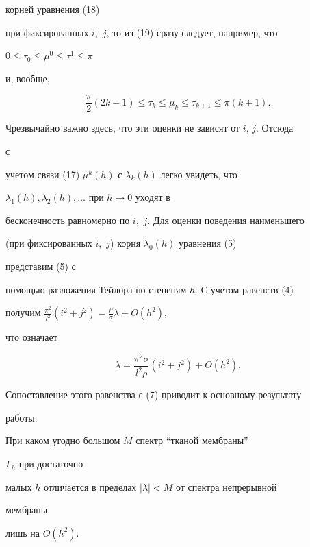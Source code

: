 корней уравнения (18) 


при фиксированных $i$,~$j$, то из (19) сразу следует, например, что 


$0\le\tau_0\le\mu^0\le\tau^1\le\pi$ 


и, вообще, 


$$ 


\frac{\pi}{2}(2k-1)\le\tau_k\le\mu_k\le\tau_{k+1}\le\pi(k+1). 


$$ 


Чрезвычайно важно здесь, что эти оценки не зависят от $i$, $j$. Отсюда 


с 


учетом связи (17) $\mu^k(h)$ с $\lambda_k(h)$ легко увидеть, что 


$\lambda_1(h),\lambda_2(h),\dotsc$ при $h\to0$ уходят в 


бесконечность равномерно по $i$,~$j$. Для оценки поведения наименьшего 


(при фиксированных $i$,~$j$) корня $\lambda_0(h)$ уравнения (5) 


представим (5) с 


помощью разложения Тейлора по степеням $h$. С учетом равенств (4) 


получим $\frac{\pi^2}{l^2}(i^2+j^2)=\frac{\rho}{\sigma}\lambda+O(h^2)$, 


что означает 


$$ 


\lambda=\frac{\pi^2\sigma}{l^2\rho}(i^2+j^2)+O(h^2). 


$$ 


Сопоставление этого равенства с (7) приводит к основному результату 


работы. 


 


\begin{thm} 


При каком угодно большом $M$ спектр ``тканой мембраны'' 


$\Gamma_h$ при достаточно 


малых $h$ отличается в пределах $|\lambda|<M$ от спектра непрерывной 


мембраны 


лишь на $O(h^2)$. 


\end{thm} 


 


